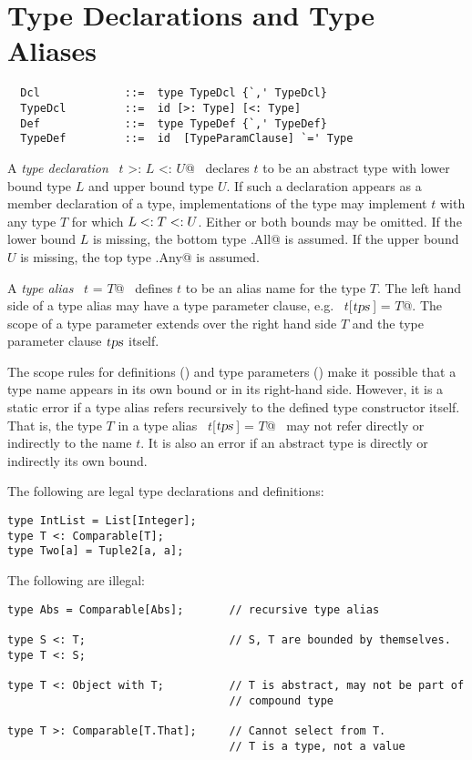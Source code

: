 \documentclass[a4paper,12pt,twoside,titlepage]{book}
\newcommand{\tps}{\mbox{\sl tps}}
\begin{document}
\section{Type Declarations and Type Aliases}
\label{sec:typedcl}
\label{sec:typealias}

\syntax\begin{lstlisting}
  Dcl             ::=  type TypeDcl {`,' TypeDcl}
  TypeDcl         ::=  id [>: Type] [<: Type]
  Def             ::=  type TypeDef {`,' TypeDef}
  TypeDef         ::=  id  [TypeParamClause] `=' Type
\end{lstlisting}

A {\em type declaration} ~\lstinline@type $t$ >: $L$ <: $U$@~ declares $t$ to
be an abstract type with lower bound type $L$ and upper bound
type $U$.  If such a declaration appears as a member declaration
of a type, implementations of the type may implement $t$ with any
type $T$ for which $L <: T <: U$. Either or both bounds may
be omitted.  If the lower bound $L$ is missing, the bottom type
\lstinline@scala.All@ is assumed.  If the upper bound $U$ is missing,
the top type \lstinline@scala.Any@ is assumed.

A {\em type alias} ~\lstinline@type $t$ = $T$@~ defines $t$ to be an alias
name for the type $T$.  The left hand side of a type alias may
have a type parameter clause, e.g. ~\lstinline@type $t$[$\tps\,$] = $T$@.  The scope
of a type parameter extends over the right hand side $T$ and the
type parameter clause $\tps$ itself.  

The scope rules for definitions () and type parameters
() make it possible that a type name appears in its
own bound or in its right-hand side.  However, it is a static error if
a type alias refers recursively to the defined type constructor itself.  
That is, the type $T$ in a type alias ~\lstinline@type $t$[$\tps\,$] = $T$@~ may not refer
directly or indirectly to the name $t$.  It is also an error if
an abstract type is directly or indirectly its own bound.

\example The following are legal type declarations and definitions:
\begin{lstlisting}
type IntList = List[Integer];
type T <: Comparable[T];
type Two[a] = Tuple2[a, a];
\end{lstlisting}

The following are illegal:
\begin{lstlisting}
type Abs = Comparable[Abs];       // recursive type alias

type S <: T;                      // S, T are bounded by themselves.
type T <: S;

type T <: Object with T;          // T is abstract, may not be part of
                                  // compound type

type T >: Comparable[T.That];     // Cannot select from T.
                                  // T is a type, not a value
\end{lstlisting}
\end{document}
